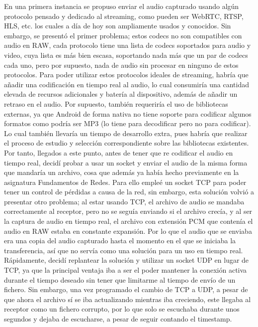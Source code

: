 En una primera instancia se propuso enviar el audio capturado usando algún
protocolo pensado y dedicado al streaming, como pueden ser WebRTC, RTSP, HLS,
etc. los cuales a día de hoy son ampliamente usados y conocidos. Sin embargo, se
presentó el primer problema; estos codecs no son compatibles con audio en RAW,
cada protocolo tiene una lista de codecs soportados para audio y video, cuya
lista es más bien escasa, soportando nada más que un par de codecs cada uno,
pero por supuesto, nada de audio sin procesar en ninguno de estos protocolos.
Para poder utilizar estos protocolos ideales de streaming, habría que añadir una
codificación en tiempo real al audio, lo cual consumiría una cantidad elevada de
recursos adicionales y batería al dispositivo, además de añadir un retraso en el
audio. Por supuesto, también requeriría el uso de bibliotecas externas, ya que
Android de forma nativa no tiene soporte para codificar algunos formatos como
podría ser MP3 (lo tiene para decodificar pero no para codificar). Lo cual
también llevaría un tiempo de desarrollo extra, pues habría que realizar el
proceso de estudio y selección correspondiente sobre las bibliotecas existentes.\\

Por tanto, llegados a este punto, antes de tener que re codificar el audio en
tiempo real, decidí probar a usar un socket y enviar el audio de la misma forma
que mandaría un archivo, cosa que además ya había hecho previamente en la
asignatura Fundamentos de Redes. Para ello empleé un socket TCP para poder tener
un control de pérdidas a causa de la red, sin embargo, esta solución volvió a
presentar otro problema; al estar usando TCP, el archivo de audio se mandaba
correctamente al receptor, pero no se seguía enviando si el archivo crecía, y al
ser la captura de audio en tiempo real, el archivo con extensión PCM que
contenía el audio en RAW estaba en constante expansión. Por lo que el audio que
se enviaba era una copia del audio capturado hasta el momento en el que se
iniciaba la transferencia, así que no servía como una solución para un uso en
tiempo real.\\

Rápidamente, decidí replantear la solución y utilizar un socket UDP en lugar de
TCP, ya que la principal ventaja iba a ser el poder mantener la conexión activa
durante el tiempo deseado sin tener que limitarme al tiempo de envío de un
fichero. Sin embargo, una vez programado el cambio de TCP a UDP, a pesar de que
ahora el archivo sí se iba actualizando mientras iba creciendo, este llegaba al
receptor como un fichero corrupto, por lo que solo se escuchaba durante unos
segundos y dejaba de escucharse, a pesar de seguir contando el timestamp.\\

